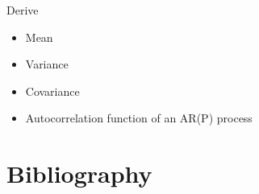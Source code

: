 \documentclass[
  11pt,
  a4paper,
]{report}
\begin{document}
Derive

\begin{itemize}
\item
  Mean
\item
  Variance
\item
  Covariance
\item
  Autocorrelation function of an AR(P) process
\end{itemize}


\chapter*{Bibliography}\label{bibliography}


\printbibliography[heading=none]
\end{document}
